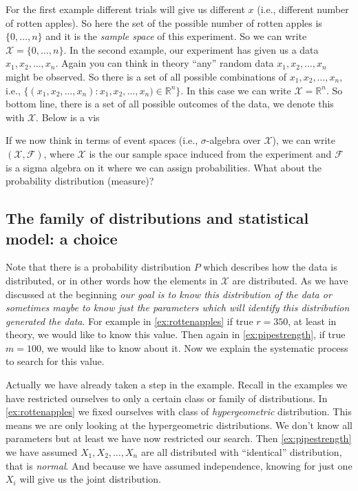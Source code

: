 \documentclass[ 11pt,%
				a4paper,%
				twoside,%
				headinclude,%
				footinclude = true,%
				cleardoublepage = empty,%
				reqno]{scrbook}
\begin{document}
\begin{example}

  For the first example different trials will give us different $x$ (i.e., different number of rotten apples). So here the set of the possible number of rotten apples is $\{0, \ldots, n\}$ and it is the \emph{sample space} of this experiment. So we can write  $\mathcal{X}=\{0, \ldots, n\}$. In the second example, our experiment has given us a data $x_1, x_2, \ldots, x_n$. Again you can think in theory ``any'' random data $x_1, x_2, \ldots, x_n$ might be observed. So there is a set of all possible combinations of $x_1, x_2, \ldots, x_n$, i.e., ${\{(x_1, x_2, \ldots, x_n): x_1, x_2, \ldots, x_n)\in \mathbb{R}^n\}}$. In this case we can write $\mathcal{X}=\mathbb{R}^{n}$. So bottom line, there is a set of all possible outcomes of the data, we denote this with $\mathcal{X}$. Below is a vis
\end{example}


  If we now think in terms of event spaces (i.e., $\sigma$-algebra over $\mathcal{X}$), we can write $(\mathcal{X}, \mathscr{F})$, where $\mathcal{X}$ is the our sample space induced from the experiment and $\mathscr{F}$ is a sigma algebra on it where we can assign probabilities. What about the probability distribution (measure)? 


\subsection{The family of distributions and statistical model: a choice}


    Note that there is a probability distribution $P$ which describes how the data is distributed, or in other words how the elements in $\mathcal{X}$ are distributed. As we have discussed at the beginning \emph{our goal is to know this distribution of the data or sometimes maybe to know just the parameters which will identify this distribution generated the data}. For example in \cref{ex:rottenapples} if true $r = 350$, at least in theory, we would like to know this value. Then again in \cref{ex:pipestrength}, if true $m = 100$, we would like to know about it. Now we explain the systematic process to search for this value. 

\begin{example}

Actually we have already taken a step in the example. Recall in the examples we have restricted ourselves to only a certain class or family of distributions. In \cref{ex:rottenapples} we fixed ourselves with class of \emph{hypergeometric} distribution. This means we are only looking at the hypergeometric distributions. We don't know all parameters but at least we have now restricted our search. Then \cref{ex:pipestrength} we have assumed $X_1, X_2, \dots, X_n$ are all distributed with ``identical'' distribution, that is \emph{normal}. And because we have assumed independence, knowing for just one $X_i$ will give us the joint distribution.
  
\end{example}
\end{document}
